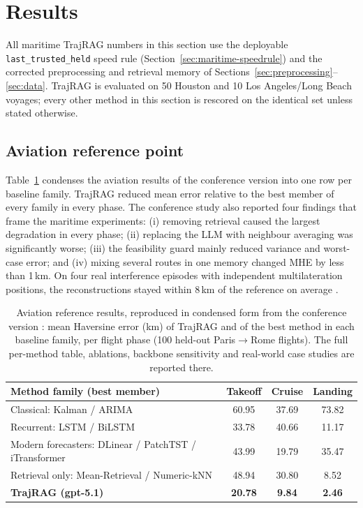 \section{Results}
\label{sec:results}

All maritime TrajRAG numbers in this section use the deployable
\texttt{last\_trusted\_held} speed rule (Section~\ref{sec:maritime-speedrule})
and the corrected preprocessing and retrieval memory of
Sections~\ref{sec:preprocessing}--\ref{sec:data}. TrajRAG is evaluated on 50
Houston and 10 Los Angeles/Long Beach voyages; every other method in this
section is rescored on the identical set unless stated otherwise.

\subsection{Aviation reference point}
\label{sec:aviation-reference}

Table~\ref{tab:aviation-ref} condenses the aviation results of the conference
version into one row per baseline family. TrajRAG reduced mean error
relative to the best member of every family in every phase. The conference
study also reported four findings that frame the maritime experiments: (i)
removing retrieval caused the largest degradation in every phase; (ii)
replacing the LLM with neighbour averaging was significantly worse; (iii)
the feasibility guard mainly reduced variance and worst-case error; and (iv)
mixing several routes in one memory changed MHE by less than 1\,km. On four
real interference episodes with independent multilateration positions, the
reconstructions stayed within 8\,km of the reference on average
\citep{felendler2026trajrag}.

\begin{table}[t]
\centering
\caption{Aviation reference results, reproduced in condensed form from the
conference version \citep{felendler2026trajrag}: mean Haversine error (km)
of TrajRAG and of the best method in each baseline family, per flight phase
(100 held-out Paris$\to$Rome flights). The full per-method table,
ablations, backbone sensitivity and real-world case studies are reported
there.}
\label{tab:aviation-ref}
\footnotesize
\begin{tabular}{p{6.2cm}ccc}
\toprule
Method family (best member) & Takeoff & Cruise & Landing \\
\midrule
Classical: Kalman / ARIMA & 60.95 & 37.69 & 73.82 \\
Recurrent: LSTM / BiLSTM & 33.78 & 40.66 & 11.17 \\
Modern forecasters: DLinear / PatchTST / iTransformer & 43.99 & 19.79 & 35.47 \\
Retrieval only: Mean-Retrieval / Numeric-kNN & 48.94 & 30.80 & 8.52 \\
\textbf{TrajRAG (gpt-5.1)} & \textbf{20.78} & \textbf{9.84} & \textbf{2.46} \\
\bottomrule
\end{tabular}
\end{table}

